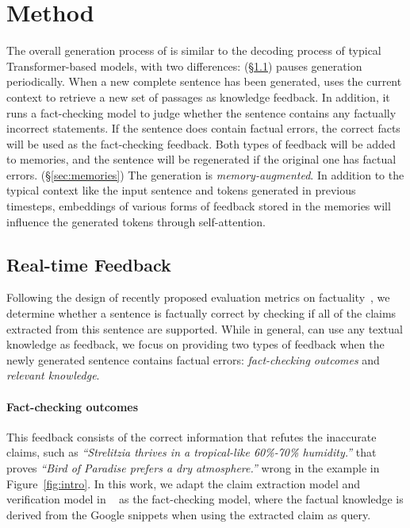 \section{Method}
\label{sec:method}

The overall generation process of \model is similar to the decoding process of typical Transformer-based models, with two differences: (\S\ref{sec:feedback}) \model pauses generation periodically. When a new complete sentence has been generated, \model uses the current context to retrieve a new set of passages as knowledge feedback. In addition, it runs a fact-checking model to judge whether the sentence contains any factually incorrect statements. 
If the sentence does contain factual errors, the correct facts will be used as the fact-checking feedback. Both types of feedback will be added to memories, and the sentence will be regenerated if the original one has factual errors. 
(\S\ref{sec:memories}) The generation is \emph{memory-augmented}. In addition to the typical context like the input sentence and tokens generated in previous timesteps, embeddings of various forms of feedback stored in the memories will influence the generated tokens through self-attention.

\subsection{Real-time Feedback}
\label{sec:feedback}

Following the design of recently proposed evaluation metrics on factuality~\citep{min-etal-2023-factscore,wei2024longform,song-etal-2024-veriscore}, we determine whether a sentence is factually correct by checking if all of the claims extracted from this sentence are supported.
While in general, \model can use any textual knowledge as feedback, we focus on providing two types of feedback when the newly generated sentence contains factual errors: \emph{fact-checking outcomes} and \emph{relevant knowledge}.

\paragraph{Fact-checking outcomes} This feedback consists of the correct information that refutes the inaccurate claims, such as \textit{``Strelitzia thrives in a tropical-like 60\%-70\% humidity.''} that proves \textit{``Bird of Paradise prefers a dry atmosphere.''} wrong in the example in Figure~\ref{fig:intro}. 
In this work, we adapt the claim extraction model and verification model in \vs~\citep{song-etal-2024-veriscore} as the fact-checking model, where the factual knowledge is derived from the Google snippets when using the extracted claim as query. 

